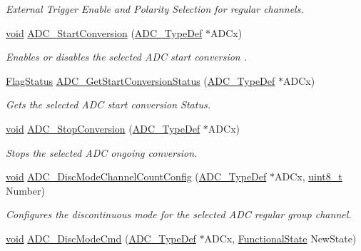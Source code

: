 \begin{DoxyCompactItemize}
\begin{DoxyCompactList}\small\item\em External Trigger Enable and Polarity Selection for regular channels. \end{DoxyCompactList}\item 
\hyperlink{group___n_a_m_e_ga18028b8badbf1ea7e704ccac3c488e82}{void} \hyperlink{group___a_d_c___group4_gae79cdf81d4ec0d779312dea115e479fa}{A\-D\-C\-\_\-\-Start\-Conversion} (\hyperlink{struct_a_d_c___type_def}{A\-D\-C\-\_\-\-Type\-Def} $\ast$A\-D\-Cx)
\begin{DoxyCompactList}\small\item\em Enables or disables the selected A\-D\-C start conversion . \end{DoxyCompactList}\item 
\hyperlink{group___exported__types_ga89136caac2e14c55151f527ac02daaff}{Flag\-Status} \hyperlink{group___a_d_c___group4_ga9d880667c84176493e0f4c1ed3a40ace}{A\-D\-C\-\_\-\-Get\-Start\-Conversion\-Status} (\hyperlink{struct_a_d_c___type_def}{A\-D\-C\-\_\-\-Type\-Def} $\ast$A\-D\-Cx)
\begin{DoxyCompactList}\small\item\em Gets the selected A\-D\-C start conversion Status. \end{DoxyCompactList}\item 
\hyperlink{group___n_a_m_e_ga18028b8badbf1ea7e704ccac3c488e82}{void} \hyperlink{group___a_d_c___group4_ga872604d9953de5e4059aa3c22b77ed08}{A\-D\-C\-\_\-\-Stop\-Conversion} (\hyperlink{struct_a_d_c___type_def}{A\-D\-C\-\_\-\-Type\-Def} $\ast$A\-D\-Cx)
\begin{DoxyCompactList}\small\item\em Stops the selected A\-D\-C ongoing conversion. \end{DoxyCompactList}\item 
\hyperlink{group___n_a_m_e_ga18028b8badbf1ea7e704ccac3c488e82}{void} \hyperlink{group___a_d_c___group4_ga6eb241ba82d67d1371136c9132083937}{A\-D\-C\-\_\-\-Disc\-Mode\-Channel\-Count\-Config} (\hyperlink{struct_a_d_c___type_def}{A\-D\-C\-\_\-\-Type\-Def} $\ast$A\-D\-Cx, \hyperlink{stdint_8h_aba7bc1797add20fe3efdf37ced1182c5}{uint8\-\_\-t} Number)
\begin{DoxyCompactList}\small\item\em Configures the discontinuous mode for the selected A\-D\-C regular group channel. \end{DoxyCompactList}\item 
\hyperlink{group___n_a_m_e_ga18028b8badbf1ea7e704ccac3c488e82}{void} \hyperlink{group___a_d_c___group4_ga1909649d10253ce88d986ffbb94a4be6}{A\-D\-C\-\_\-\-Disc\-Mode\-Cmd} (\hyperlink{struct_a_d_c___type_def}{A\-D\-C\-\_\-\-Type\-Def} $\ast$A\-D\-Cx, \hyperlink{group___exported__types_gac9a7e9a35d2513ec15c3b537aaa4fba1}{Functional\-State} New\-State)

\end{DoxyCompactItemize}
